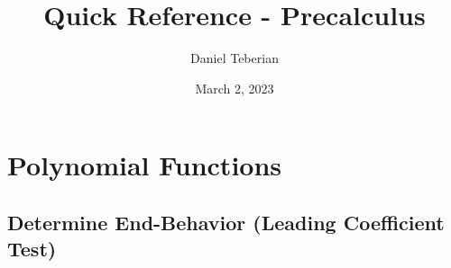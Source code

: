 \documentclass{article}
\begin{document}
\title{Quick Reference - Precalculus}
\author{Daniel Teberian}
\date{March 2, 2023{}}
\maketitle{}
\newpage

\section{Polynomial Functions}
\subsection{Determine End-Behavior (Leading Coefficient Test)}
\end{document}
